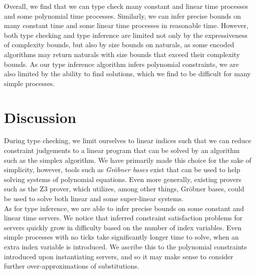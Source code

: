 
Overall, we find that we can type check many constant and linear time processes and some polynomial time processes. Similarly, we can infer precise bounds on many constant time and some linear time processes in reasonable time. However, both type checking and type inference are limited not only by the expressiveness of complexity bounds, but also by size bounds on naturals, as some encoded algorithms may return naturals with size bounds that exceed their complexity bounds. As our type inference algorithm infers polynomial constraints, we are also limited by the ability to find solutions, which we find to be difficult for many simple processes.

\section{Discussion}

During type checking, we limit ourselves to linear indices such that we can reduce constraint judgements to a linear program that can be solved by an algorithm such as the simplex algorithm. We have primarily made this choice for the sake of simplicity, however, tools such as \textit{Gröbner bases} exist that can be used to help solving systems of polynomial equations. Even more generally, existing provers such as the Z3 prover, which utilizes, among other things, Gröbner bases, could be used to solve both linear and some super-linear systems.\\

As for type inference, we are able to infer precise bounds on some constant and linear time servers. We notice that inferred constraint satisfaction problems for servers quickly grow in difficulty based on the number of index variables. Even simple processes with no ticks take significantly longer time to solve, when an extra index variable is introduced. We ascribe this to the polynomial constraints introduced upon instantiating servers, and so it may make sense to consider further over-approximations of substitutions.\\

